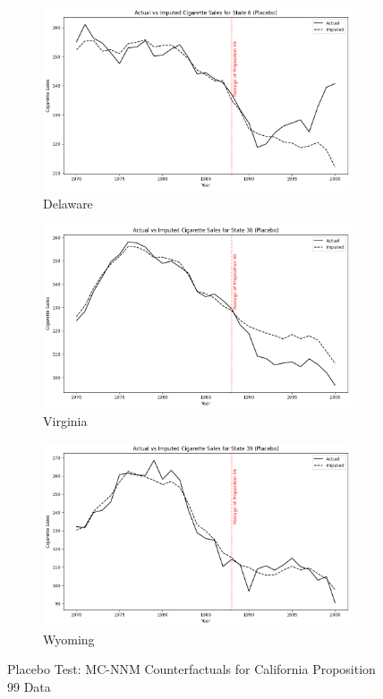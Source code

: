 \begin{figure}[htbp]
    \centering
    \begin{subfigure}[c]{0.3\textwidth}
        \includegraphics[width=\textwidth]{../figures/mc-nnm-2.png}
        \caption{Delaware}
        \label{fig:placebo_1}
    \end{subfigure}
    \begin{subfigure}[c]{0.3\textwidth}
        \includegraphics[width=\textwidth]{../figures/mc-nnm-3.png}
        \caption{Virginia}
        \label{fig:placebo_2}
    \end{subfigure}
    \begin{subfigure}[c]{0.3\textwidth}
        \includegraphics[width=\textwidth]{../figures/mc-nnm-4.png}
        \caption{Wyoming}
        \label{fig:placebo_3}
    \end{subfigure}
    \caption{Placebo Test: MC-NNM Counterfactuals for California Proposition 99 Data}
    \label{fig:placebo_mcnnm}
\end{figure}

